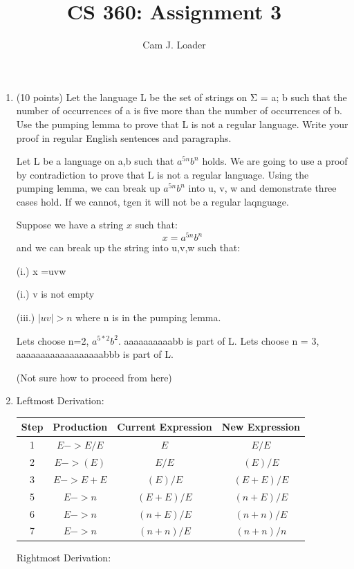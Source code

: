 \documentclass[12pt]{article}
\title{CS 360: Assignment 3}
\author{Cam J. Loader}
\begin{document}
\maketitle

\begin{enumerate}

\item  (10 points) Let the language L be the set of strings on Σ = {a; b} such that the number of
occurrences of a is five more than the number of occurrences of b. Use the pumping lemma
to prove that L is not a regular language. Write your proof in regular English sentences and
paragraphs.

Let L be a language on {a,b} such that $a^{5n}b^n$ holds. We are going to use a proof by contradiction to prove that L is not a regular language. Using the pumping lemma, we can break up $a^{5n}b^n$ into u, v, w and demonstrate three cases hold. If we cannot, tgen it will not be a regular laqnguage.

Suppose we have a string  $x$ such that:
$$x = a^{5n}b^n$$ and we can break up the string into u,v,w such that:

(i.) x =uvw

(i.) v is not empty

(iii.) $|uv|>n $ where n is in the pumping lemma.


Lets choose n=2, $a^{5*2}b^2$. aaaaaaaaaabb is part of L. Lets choose n = 3, aaaaaaaaaaaaaaaaaabbb is part of L.

(Not sure how to proceed from here)

\item 

Leftmost Derivation:

\begin{tabular}{| c | c | c| c|}
    \hline
    Step & Production & Current Expression & New Expression \\ \hline \hline
    1 & $E -> E/E$ & $E$ & $E/E $\\
    2 & $E -> (E)$ & $E/E $& $(E)/E$ \\
    3 & $E -> E+E$ & $(E)/E $& $(E+E)/E$ \\
    5 & $E -> n$ & $(E+E)/E $& $(n+E)/E$ \\
    6 & $E -> n$ & $(n+E)/E $& $(n+n)/E$ \\
    7 & $E -> n$ & $(n+n)/E $& $(n+n)/n$ \\
\hline
\end{tabular}

Rightmost Derivation:


\end{enumerate}
\end{document}
